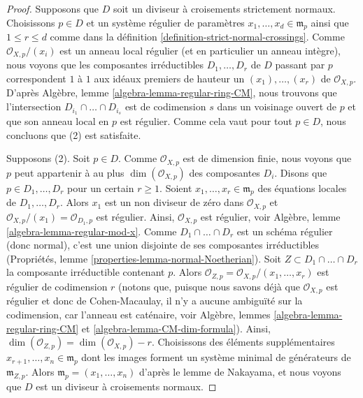 \begin{proof}
Supposons que $D$ soit un diviseur à croisements strictement normaux. Choisissons $p \in D$
et un système régulier de paramètres $x_1, \ldots, x_d \in \mathfrak m_p$
ainsi que $1 \leq r \leq d$ comme dans la
définition \ref{definition-strict-normal-crossings}.
Comme $\mathcal{O}_{X, p}/(x_i)$ est un anneau local régulier
(et en particulier un anneau intègre), nous voyons que les composantes irréductibles
$D_1, \ldots, D_r$ de $D$ passant par $p$ correspondent $1$ à $1$
aux idéaux premiers de hauteur un $(x_1), \ldots, (x_r)$ de $\mathcal{O}_{X, p}$.
D'après Algèbre, lemme \ref{algebra-lemma-regular-ring-CM},
nous trouvons que l'intersection $D_{i_1} \cap \ldots \cap D_{i_s}$
est de codimension $s$ dans un voisinage ouvert de $p$
et que son anneau local en $p$ est régulier.
Comme cela vaut pour tout $p \in D$, nous concluons que (2) est satisfaite.

\medskip\noindent
Supposons (2). Soit $p \in D$. Comme $\mathcal{O}_{X, p}$ est de dimension
finie, nous voyons que $p$ peut appartenir à au plus
$\dim(\mathcal{O}_{X, p})$ des composantes $D_i$.
Disons que $p \in D_1, \ldots, D_r$ pour un certain $r \geq 1$.
Soient $x_1, \ldots, x_r \in \mathfrak m_p$ des équations locales
de $D_1, \ldots, D_r$. Alors $x_1$ est un non diviseur de zéro dans $\mathcal{O}_{X, p}$
et $\mathcal{O}_{X, p}/(x_1) = \mathcal{O}_{D_1, p}$ est régulier.
Ainsi, $\mathcal{O}_{X, p}$ est régulier, voir
Algèbre, lemme \ref{algebra-lemma-regular-mod-x}.
Comme $D_1 \cap \ldots \cap D_r$ est un schéma régulier (donc normal),
c'est une union disjointe de ses composantes irréductibles
(Propriétés, lemme \ref{properties-lemma-normal-Noetherian}).
Soit $Z \subset D_1 \cap \ldots \cap D_r$
la composante irréductible contenant $p$.
Alors $\mathcal{O}_{Z, p} = \mathcal{O}_{X, p}/(x_1, \ldots, x_r)$
est régulier de codimension $r$ (notons que, puisque nous savons déjà
que $\mathcal{O}_{X, p}$ est régulier et donc de Cohen-Macaulay,
il n'y a aucune ambiguïté sur la codimension, car l'anneau est caténaire, voir
Algèbre, lemmes \ref{algebra-lemma-regular-ring-CM} et
\ref{algebra-lemma-CM-dim-formula}).
Ainsi, $\dim(\mathcal{O}_{Z, p}) = \dim(\mathcal{O}_{X, p}) - r$.
Choisissons des éléments supplémentaires $x_{r + 1}, \ldots, x_n \in \mathfrak m_p$
dont les images forment un système minimal de générateurs de $\mathfrak m_{Z, p}$.
Alors $\mathfrak m_p = (x_1, \ldots, x_n)$ d'après le lemme de Nakayama,
et nous voyons que $D$ est un diviseur à croisements normaux.
\end{proof}

